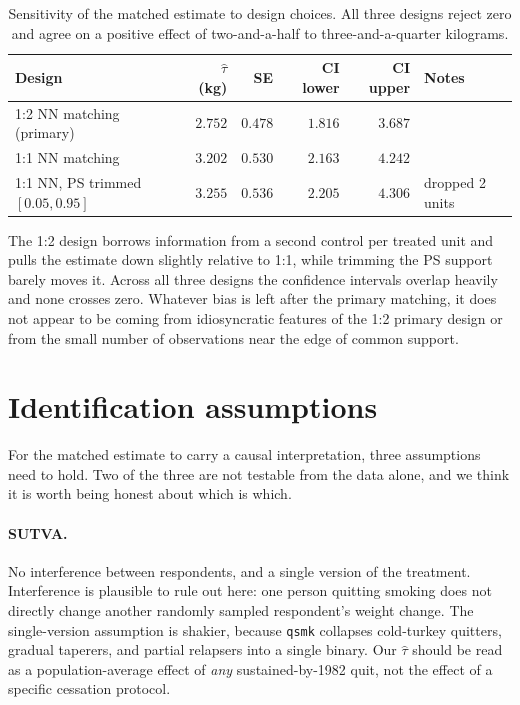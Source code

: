 \documentclass[11pt]{article}
\begin{document}
\begin{table}[H]
\centering
\small
\begin{tabular}{@{}lrrrrl@{}}
\toprule
Design & $\hat\tau$ (kg) & SE & CI lower & CI upper & Notes \\
\midrule
1:2 NN matching (primary)        & $2.752$ & $0.478$ & $1.816$ & $3.687$ & \\
1:1 NN matching                  & $3.202$ & $0.530$ & $2.163$ & $4.242$ & \\
1:1 NN, PS trimmed $[0.05,0.95]$ & $3.255$ & $0.536$ & $2.205$ & $4.306$ & dropped 2 units \\
\bottomrule
\end{tabular}
\caption{Sensitivity of the matched estimate to design choices. All three
designs reject zero and agree on a positive effect of two-and-a-half to
three-and-a-quarter kilograms.}
\label{tab:sens}
\end{table}

The 1:2 design borrows information from a second control per treated unit
and pulls the estimate down slightly relative to 1:1, while trimming the PS support
barely moves it. Across all three designs the confidence intervals
overlap heavily and none crosses zero. Whatever bias is left after the
primary matching, it does not appear to be coming from idiosyncratic
features of the 1:2 primary design or from the small number of observations near
the edge of common support.

\section{Identification assumptions}\label{sec:identification}

For the matched estimate to carry a causal interpretation, three
assumptions need to hold. Two of the three are not testable from the data
alone, and we think it is worth being honest about which is which.

\paragraph{SUTVA.} No interference between respondents, and a single
version of the treatment. Interference is plausible to rule out here:
one person quitting smoking does not directly change another randomly
sampled respondent's weight change. The single-version assumption is
shakier, because \texttt{qsmk} collapses cold-turkey quitters,
gradual taperers, and partial relapsers into a single binary. Our
$\hat\tau$ should be read as a population-average effect of \emph{any}
sustained-by-1982 quit, not the effect of a specific cessation protocol.
\end{document}
